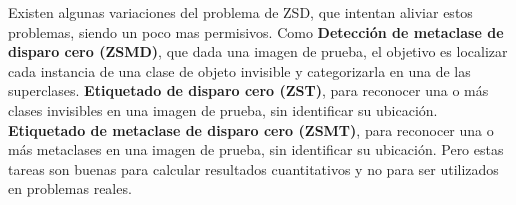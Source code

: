 Existen algunas variaciones del problema de ZSD, que intentan aliviar estos problemas, siendo un poco mas permisivos. Como \textbf{Detección de metaclase de disparo cero (ZSMD)}, que dada una imagen de prueba, el objetivo es localizar cada instancia de una clase de objeto invisible y categorizarla en una de las superclases. \textbf{Etiquetado de disparo cero (ZST)}, para reconocer una o más clases invisibles en una imagen de prueba, sin identificar su ubicación. \textbf{Etiquetado de metaclase de disparo cero (ZSMT)}, para reconocer una o más metaclases en una imagen de prueba, sin identificar su ubicación. Pero estas tareas son buenas para calcular resultados cuantitativos y no para ser utilizados en problemas reales.
